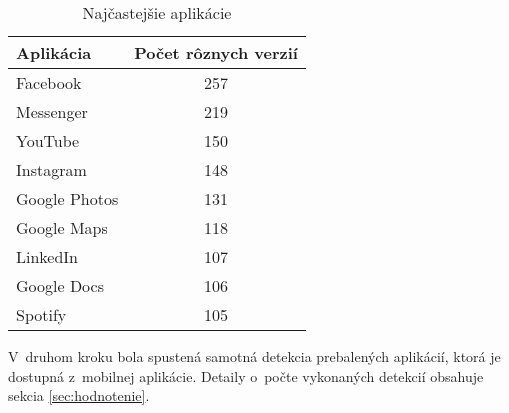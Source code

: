\begin{table}[htb]
\centering
\begin{tabular}{|l c|}
\hline
\textbf{Aplikácia}     & \textbf{Počet rôznych verzií} \\ \hline
Facebook      & 257                  \\
Messenger     & 219                  \\
YouTube       & 150                   \\
Instagram     & 148                  \\
Google Photos & 131                   \\
Google Maps   & 118                   \\
LinkedIn      & 107                   \\
Google Docs   & 106                   \\ 
Spotify       & 105                   \\ \hline
\end{tabular}
\caption{Najčastejšie aplikácie}
\label{apps-common}
\end{table}

V~druhom kroku bola spustená samotná detekcia prebalených aplikácií, ktorá je dostupná z~mobilnej aplikácie. Detaily o~počte vykonaných detekcií obsahuje sekcia \ref{sec:hodnotenie}.
